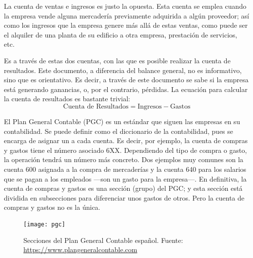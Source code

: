 \bigskip


La cuenta de ventas e ingresos es justo la opuesta. Esta cuenta se emplea cuando la empresa vende alguna mercadería previamente adquirida a algún proveedor; así como los ingresos que la empresa genere más allá de estas ventas, como puede ser el alquiler de una planta de su edificio a otra empresa, prestación de servicios, etc.

\bigskip


Es a través de estas dos cuentas, con las que es posible realizar la cuenta de resultados. Este documento, a diferencia del balance general, no es informativo, sino que es orientativo. Es decir, a través de este documento se sabe si la empresa está generando ganancias, o, por el contrario, pérdidas. La ecuación para calcular la cuenta de resultados es bastante trivial\fnm:
\begin{equation*}
    \text{Cuenta de Resultados} = \text{Ingresos} - \text{Gastos}
\end{equation*}

El Plan General Contable (PGC) es un estándar que siguen las empresas en su contabilidad. Se puede definir como el diccionario de la contabilidad, pues se encarga de asignar un  a cada cuenta. Es decir, por ejemplo, la cuenta de compras y gastos tiene el número asociado 6XX. Dependiendo del tipo de compra o gasto, la operación tendrá un número más concreto. Dos ejemplos muy comunes son la cuenta 600 asignada a la compra de mercaderías y la cuenta 640 para los salarios que se pagan a los empleados ---son un gasto para la empresa---. En definitiva, la cuenta de compras y gastos es una sección (grupo) del PGC\fnm; y esta sección está dividida en subsecciones para diferenciar unos gastos de otros. Pero la cuenta de compras y gastos no es la única.
\label{PGC}
\begin{figure}[H]
    \centering
    \texttt{[image: pgc]}
    \caption{Secciones del Plan General Contable español. \scriptsize{Fuente: \url{https://www.plangeneralcontable.com}}}
    \label{pgc}
\end{figure}

